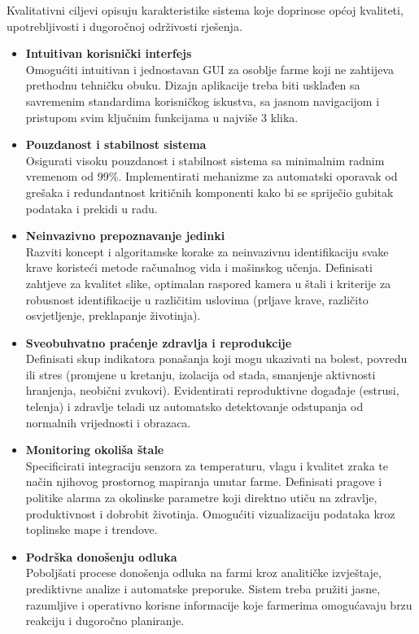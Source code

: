 \documentclass{article}
\begin{document}
Kvalitativni ciljevi opisuju karakteristike sistema koje doprinose općoj kvaliteti, upotrebljivosti i dugoročnoj održivosti rješenja.

\begin{itemize}
\item \textbf{Intuitivan korisnički interfejs}\\
Omogućiti intuitivan i jednostavan GUI za osoblje farme koji ne zahtijeva prethodnu tehničku obuku. Dizajn aplikacije treba biti usklađen sa savremenim standardima korisničkog iskustva, sa jasnom navigacijom i pristupom svim ključnim funkcijama u najviše 3 klika.

\item \textbf{Pouzdanost i stabilnost sistema}\\
Osigurati visoku pouzdanost i stabilnost sistema sa minimalnim radnim vremenom od 99\%. Implementirati mehanizme za automatski oporavak od grešaka i redundantnost kritičnih komponenti kako bi se spriječio gubitak podataka i prekidi u radu. 

\item \textbf{Neinvazivno prepoznavanje jedinki}\\
Razviti koncept i algoritamske korake za neinvazivnu identifikaciju svake krave koristeći metode računalnog vida i mašinskog učenja. Definisati zahtjeve za kvalitet slike, optimalan raspored kamera u štali i kriterije za robusnost identifikacije u različitim uslovima (prljave krave, različito osvjetljenje, preklapanje životinja).

\item \textbf{Sveobuhvatno praćenje zdravlja i reprodukcije}\\
Definisati skup indikatora ponašanja koji mogu ukazivati na bolest, povredu ili stres (promjene u kretanju, izolacija od stada, smanjenje aktivnosti hranjenja, neobični zvukovi). Evidentirati reproduktivne događaje (estrusi, telenja) i zdravlje teladi uz automatsko detektovanje odstupanja od normalnih vrijednosti i obrazaca.

\item \textbf{Monitoring okoliša štale}\\
Specificirati integraciju senzora za temperaturu, vlagu i kvalitet zraka te način njihovog prostornog mapiranja unutar farme. Definisati pragove i politike alarma za okolinske parametre koji direktno utiču na zdravlje, produktivnost i dobrobit životinja. Omogućiti vizualizaciju podataka kroz toplinske mape i trendove.

\item \textbf{Podrška donošenju odluka}\\
Poboljšati procese donošenja odluka na farmi kroz analitičke izvještaje, prediktivne analize i automatske preporuke. Sistem treba pružiti jasne, razumljive i operativno korisne informacije koje farmerima omogućavaju brzu reakciju i dugoročno planiranje.


\end{itemize}
\end{document}
